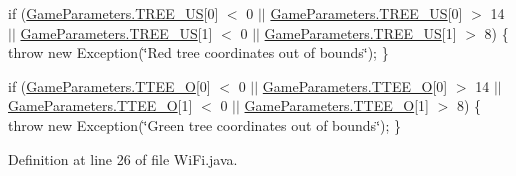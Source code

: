 if (\hyperlink{enumca_1_1mcgill_1_1ecse211_1_1project_1_1_game_parameters_a2449dac1067326f888e8b9e8b5276c18}{Game\+Parameters.\+T\+R\+E\+E\+\_\+\+US}\mbox{[}0\mbox{]} $<$ 0 $\vert$$\vert$ \hyperlink{enumca_1_1mcgill_1_1ecse211_1_1project_1_1_game_parameters_a2449dac1067326f888e8b9e8b5276c18}{Game\+Parameters.\+T\+R\+E\+E\+\_\+\+US}\mbox{[}0\mbox{]} $>$ 14 $\vert$$\vert$ \hyperlink{enumca_1_1mcgill_1_1ecse211_1_1project_1_1_game_parameters_a2449dac1067326f888e8b9e8b5276c18}{Game\+Parameters.\+T\+R\+E\+E\+\_\+\+US}\mbox{[}1\mbox{]} $<$ 0 $\vert$$\vert$ \hyperlink{enumca_1_1mcgill_1_1ecse211_1_1project_1_1_game_parameters_a2449dac1067326f888e8b9e8b5276c18}{Game\+Parameters.\+T\+R\+E\+E\+\_\+\+US}\mbox{[}1\mbox{]} $>$ 8) \{ throw new Exception(\char`\"{}\+Red tree coordinates out of bounds\char`\"{}); \}

if (\hyperlink{enumca_1_1mcgill_1_1ecse211_1_1project_1_1_game_parameters_a50543aed3d1731225cee6fe50ebcefe0}{Game\+Parameters.\+T\+T\+E\+E\+\_\+O}\mbox{[}0\mbox{]} $<$ 0 $\vert$$\vert$ \hyperlink{enumca_1_1mcgill_1_1ecse211_1_1project_1_1_game_parameters_a50543aed3d1731225cee6fe50ebcefe0}{Game\+Parameters.\+T\+T\+E\+E\+\_\+O}\mbox{[}0\mbox{]} $>$ 14 $\vert$$\vert$ \hyperlink{enumca_1_1mcgill_1_1ecse211_1_1project_1_1_game_parameters_a50543aed3d1731225cee6fe50ebcefe0}{Game\+Parameters.\+T\+T\+E\+E\+\_\+O}\mbox{[}1\mbox{]} $<$ 0 $\vert$$\vert$ \hyperlink{enumca_1_1mcgill_1_1ecse211_1_1project_1_1_game_parameters_a50543aed3d1731225cee6fe50ebcefe0}{Game\+Parameters.\+T\+T\+E\+E\+\_\+O}\mbox{[}1\mbox{]} $>$ 8) \{ throw new Exception(\char`\"{}\+Green tree coordinates out of bounds\char`\"{}); \}

Definition at line 26 of file Wi\+Fi.\+java.


